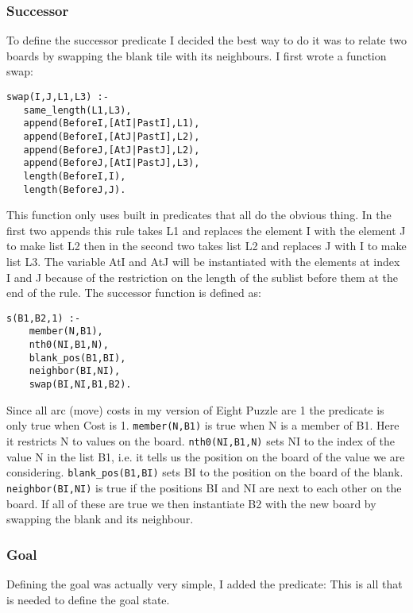 \documentclass[a4paper,10pt]{report}
\begin{document}
\subsubsection{Successor}
To define the successor predicate I decided the best way to do it was to relate two boards by swapping the blank tile with its neighbours. I first wrote a function swap:
\begin{verbatim}
swap(I,J,L1,L3) :-
   same_length(L1,L3),
   append(BeforeI,[AtI|PastI],L1),
   append(BeforeI,[AtJ|PastI],L2),
   append(BeforeJ,[AtJ|PastJ],L2),
   append(BeforeJ,[AtI|PastJ],L3),
   length(BeforeI,I),
   length(BeforeJ,J).
\end{verbatim}
This function only uses built in predicates that all do the obvious thing. In the first two appends this rule takes L1 and replaces the element I with the element J to make list L2 then in the second two takes list L2 and replaces J with I to make list L3. The variable AtI and AtJ will be instantiated with the elements at index I and J because of the restriction on the length of the sublist before them at the end of the rule.
The successor function is defined as:
\begin{verbatim}
s(B1,B2,1) :-
    member(N,B1),
    nth0(NI,B1,N),
    blank_pos(B1,BI),
    neighbor(BI,NI),
    swap(BI,NI,B1,B2).
\end{verbatim}
Since all arc (move) costs in my version of Eight Puzzle are 1 the predicate is only true when Cost is 1. \texttt{member(N,B1)} is true when N is a member of B1. Here it restricts N to values on the board. \texttt{nth0(NI,B1,N)} sets NI to the index of the value N in the list B1, i.e. it tells us the position on the board of the value we are considering. \texttt{blank_pos(B1,BI)} sets BI to the position on the board of the blank. \texttt{neighbor(BI,NI)} is true if the positions BI and NI are next to each other on the board. If all of these are true we then instantiate B2 with the new board by swapping the blank and its neighbour.
\subsubsection{Goal}
Defining the goal was actually very simple, I added the predicate: 
\noindent This is all that is needed to define the goal state.
\end{document}
